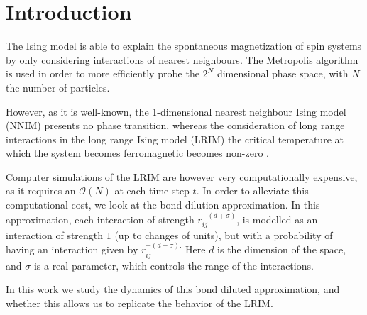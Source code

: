\section{Introduction}%
\label{sec:Introduction}

The Ising model \cite{ising1925beitrag} is able to explain the spontaneous magnetization of spin systems by only considering interactions of nearest neighbours. The Metropolis \cite{Metropolis1953} algorithm is used in order to more efficiently probe the $2^N$ dimensional phase space, with $N$ the number of particles.

However, as it is well-known, the 1-dimensional nearest neighbour Ising model (NNIM) presents no phase transition, whereas the consideration of long range interactions in the long range Ising model (LRIM) the critical temperature at which the system becomes ferromagnetic becomes non-zero \cite{Janke2023}.

Computer simulations of the LRIM are however very computationally expensive, as it requires an $\mathcal{O}(N)$ at each time step $t $.  In order to alleviate this computational cost, we look at the bond dilution approximation. In this approximation, each interaction of strength $r_{ij}^{-(d + \sigma)}$, is modelled as an interaction of strength $1$ (up to changes of units), but with a probability of having an interaction given by  $r_{ij}^{-(d+ \sigma).}$ Here $d$ is the dimension of the space, and  $\sigma$ is a real parameter, which controls the range of the interactions.

In this work we study the dynamics of this bond diluted approximation, and whether this allows us to replicate the behavior of the LRIM.
